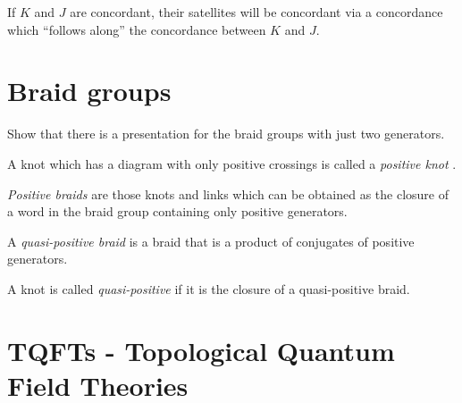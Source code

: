 If $K$ and $J$ are concordant, their satellites will be concordant
via a concordance which ``follows along'' the concordance between
$K$ and $J$.



\section{Braid groups}

\begin{exercise}
	Show that there is a presentation for the braid groups
	with just two generators.
\end{exercise}

\begin{definition}
	A knot which has a diagram with only positive crossings
	is called a \textit{positive knot} .
	
	\textit{Positive braids}  are those
	knots and links which can be obtained as the closure
	of a word in the braid group containing
	only positive generators.
	
	A \textit{quasi-positive braid} 
	is a braid that is a product of 
	conjugates of positive generators.
	
	A knot is called
	\textit{quasi-positive} 
	if it is the
	closure of a quasi-positive braid.
\end{definition}



\section{TQFTs - Topological Quantum Field Theories}



